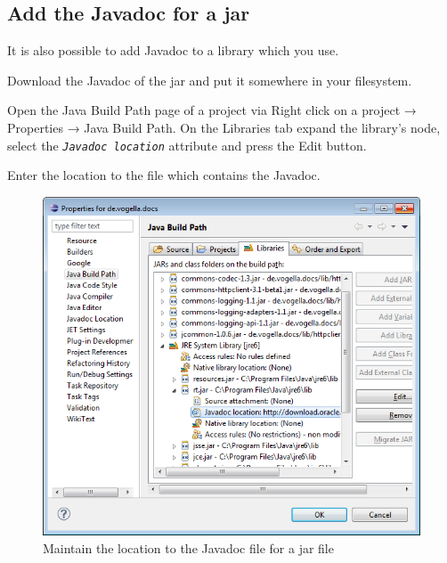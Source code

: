 \subsection{Add the Javadoc for a jar}

It is also possible to add Javadoc to a library which you use.

Download the Javadoc of the jar and put it somewhere in your filesystem.

Open the Java Build Path page of a project via Right click on a project
→ Properties → Java Build Path. On the Libraries tab expand the
library's node, select the \emph{\texttt{Javadoc location}} attribute
and press the Edit button.

Enter the location to the file which contains the Javadoc.

\begin{figure}[htbp]
\centering
\includegraphics[scale=.5]{images/javadoc}
\caption{Maintain the location to the Javadoc file for a jar file}
\end{figure}


